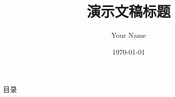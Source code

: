 \documentclass[aspectratio=169]{beamer}
\title{演示文稿标题}
\author{Your Name}
\date{\today}
\begin{document}
\begin{frame}
    \titlepage
\end{frame}

\begin{frame}{目录}
    \tableofcontents
\end{frame}


\end{document}
